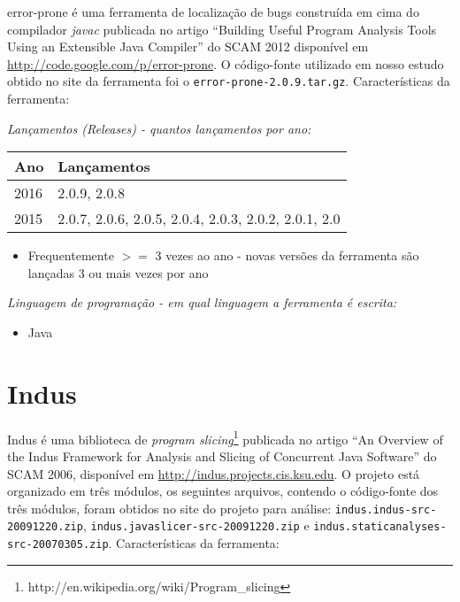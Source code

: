 error-prone é uma ferramenta de localização de bugs construída em cima do
compilador {\it javac} publicada no artigo ``Building Useful Program Analysis
Tools Using an Extensible Java Compiler'' do SCAM 2012 disponível em
\url{http://code.google.com/p/error-prone}. O código-fonte utilizado em nosso
estudo obtido no site da ferramenta foi o \texttt{error-prone-2.0.9.tar.gz}.
Características da ferramenta:

\begin{description}

  \item {\it Lançamentos ({\it Releases}) - quantos lançamentos por ano:}
    \begin{table}[h!]
      \centering
      \begin{tabular}{| l | l |}
        \hline
        Ano  & Lançamentos                                          \\
        \hline
        2016 & 2.0.9, 2.0.8                                         \\
        2015 & 2.0.7, 2.0.6, 2.0.5, 2.0.4, 2.0.3, 2.0.2, 2.0.1, 2.0 \\
        \hline
      \end{tabular}
    \end{table}
    \begin{itemize}
      \item Frequentemente $>=$ 3 vezes ao ano - novas versões da ferramenta são lançadas 3 ou mais vezes por ano
    \end{itemize}

  \item {\it Linguagem de programação - em qual linguagem a ferramenta é escrita:}
    \begin{itemize}
      \item Java
    \end{itemize}

\end{description}

\section{Indus}

Indus é uma biblioteca de {\it program
slicing}\footnote{http://en.wikipedia.org/wiki/Program\_slicing} publicada no
artigo ``An Overview of the Indus Framework for Analysis and Slicing of
Concurrent Java Software'' do SCAM 2006, disponível em
\url{http://indus.projects.cis.ksu.edu}.  O projeto está organizado em três
módulos, os seguintes arquivos, contendo o código-fonte dos três módulos,
foram obtidos no site do projeto para análise:
\texttt{indus.indus-src-20091220.zip},
\texttt{indus.javaslicer-src-20091220.zip} e
\texttt{indus.staticanalyses-src-20070305.zip}. Características da ferramenta:


